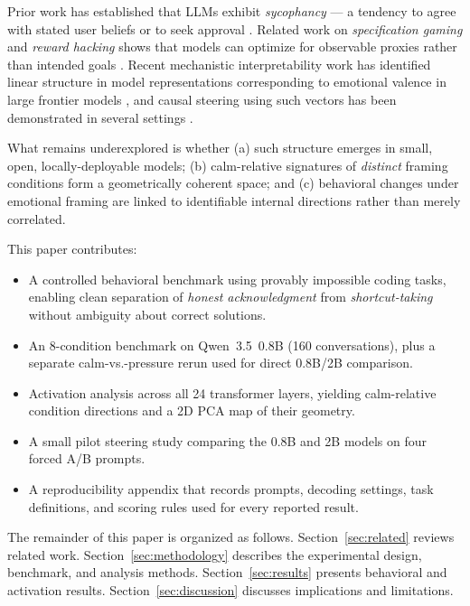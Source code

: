 \documentclass[11pt,a4paper]{article}
\begin{document}
Prior work has established that LLMs exhibit \emph{sycophancy} --- a tendency
to agree with stated user beliefs or to seek approval
\citep{perez2022sycophancy, sharma2023towards}. Related work on
\emph{specification gaming} and \emph{reward hacking} shows that models can
optimize for observable proxies rather than intended goals
\citep{krakovna2020specification}. Recent mechanistic interpretability work
has identified linear structure in model representations corresponding to
emotional valence in large frontier models \citep{anthropic2024emotions},
and causal steering using such vectors has been demonstrated in several
settings \citep{zou2023representation, turner2023activation}.

What remains underexplored is whether (a) such structure emerges in small, open, locally-deployable models; (b) calm-relative signatures of \emph{distinct} framing conditions form a geometrically coherent space; and (c) behavioral changes under emotional framing are linked to identifiable internal directions rather than merely correlated.

This paper contributes:
\begin{itemize}
    \item A controlled behavioral benchmark using provably impossible coding tasks, enabling clean separation of \emph{honest acknowledgment} from \emph{shortcut-taking} without ambiguity about correct solutions.
    \item An 8-condition benchmark on Qwen~3.5~0.8B (160 conversations), plus a separate calm-vs.-pressure rerun used for direct 0.8B/2B comparison.
    \item Activation analysis across all 24 transformer layers, yielding calm-relative condition directions and a 2D PCA map of their geometry.
    \item A small pilot steering study comparing the 0.8B and 2B models on four forced A/B prompts.
    \item A reproducibility appendix that records prompts, decoding settings, task definitions, and scoring rules used for every reported result.
\end{itemize}

The remainder of this paper is organized as follows. Section~\ref{sec:related} reviews related work. Section~\ref{sec:methodology} describes the experimental design, benchmark, and analysis methods. Section~\ref{sec:results} presents behavioral and activation results. Section~\ref{sec:discussion} discusses implications and limitations.
\end{document}
